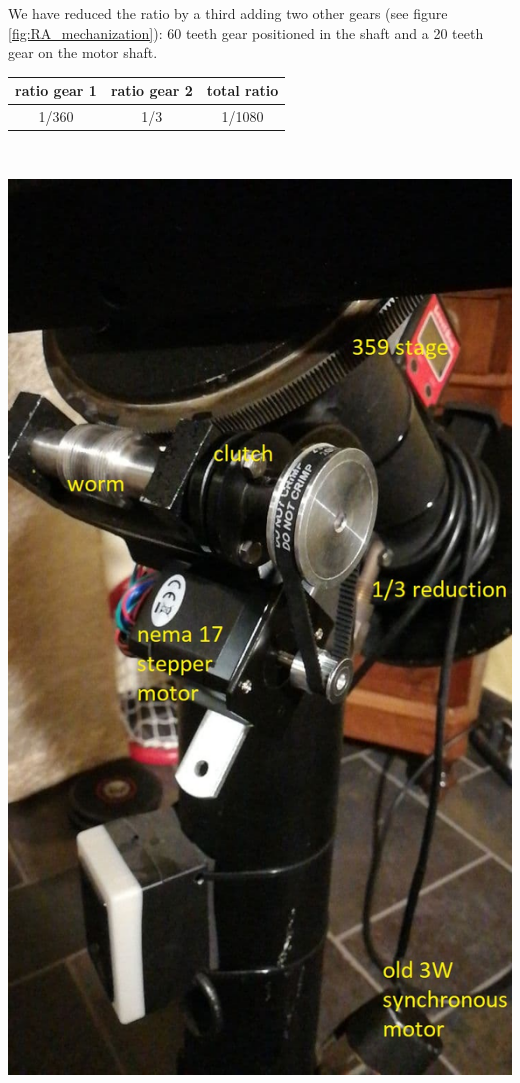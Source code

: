 \documentclass{article}
\begin{document}
\begin{multicols}{2}
        We have reduced the ratio by a third adding two other gears (see figure \ref{fig:RA_mechanization}): 60 teeth gear positioned in the shaft and a 20 teeth gear on the motor shaft.
        \\
        \begin{minipage}{.5\textwidth}
            \centering
            \begin{tabular}{cc|c}
                ratio gear 1 & ratio gear 2 & total ratio \\
                \hline
                1/360 & 1/3 & 1/1080 \\
                \hline
            \end{tabular}
            \label{tab:RA_mechanization}
        \end{minipage}
        \\
        \begin{minipage}{.5\textwidth}
            \centering
            \includegraphics[scale=0.6]{RA_motorization.jpg}  

\end{minipage}
\end{multicols}
\end{document}
